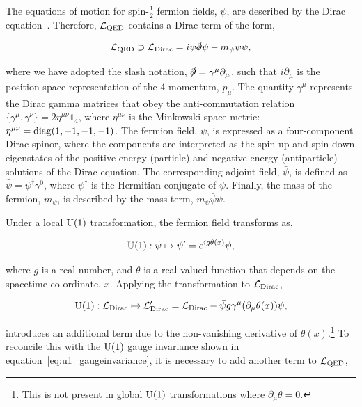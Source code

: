 The equations of motion for spin-$\frac{1}{2}$ fermion fields, $\psi$, are described by the Dirac equation~\cite{doi:10.1098_rspa.1928.0023}. Therefore, $\mathcal{L}_{\rm{QED}}$ contains a Dirac term of the form,

\begin{equation}
    \mathcal{L}_{\rm{QED}} \supset \mathcal{L}_{\rm{Dirac}} = i\bar{\psi}\slashed{\partial}\psi - m_{\psi}\bar{\psi}\psi,
\end{equation}

\noindent
where we have adopted the slash notation, $\slashed{\partial}=\gamma^\mu\partial_\mu$, such that $i\partial_\mu$ is the position space representation of the 4-momentum, $p_\mu$. The quantity $\gamma^\mu$ represents the Dirac gamma matrices that obey the anti-commutation relation $\{\gamma^\mu,\gamma^\nu\}=2\eta^{\mu\nu}\mathbb{1}_4$, where $\eta^{\mu\nu}$ is the Minkowski-space metric: $\eta^{\mu\nu}={\rm{diag}}(1,-1,-1,-1)$. The fermion field, $\psi$, is expressed as a four-component Dirac spinor, where the components are interpreted as the spin-up and spin-down eigenstates of the positive energy (particle) and negative energy (antiparticle) solutions of the Dirac equation. The corresponding adjoint field, $\bar{\psi}$, is defined as $\bar{\psi}=\psi^{\dagger}\gamma^0$, where $\psi^{\dagger}$ is the Hermitian conjugate of $\psi$. Finally, the mass of the fermion, $m_{\psi}$, is described by the mass term, $m_{\psi}\bar{\psi}\psi$.

Under a local ${\rm{U}}(1)$ transformation, the fermion field transforms as,

\begin{equation}
    {\rm{U}}(1): \psi \mapsto \psi' = e^{ig\theta(x)}\psi,
\end{equation}

\noindent
where $g$ is a real number, and $\theta$ is a real-valued function that depends on the spacetime co-ordinate, $x$. Applying the transformation to $\mathcal{L}_{\rm{Dirac}}$,

\begin{equation}\label{eq:u1_dirac}
    {\rm{U}}(1): \mathcal{L}_{\rm{Dirac}} \mapsto \mathcal{L}_{\rm{Dirac}}' = \mathcal{L}_{\rm{Dirac}} - \bar{\psi}g\gamma^\mu(\partial_\mu\theta(x))\psi,
\end{equation}

\noindent
introduces an additional term due to the non-vanishing derivative of $\theta(x)$.\footnote{This is not present in global ${\rm{U}}(1)$ transformations where $\partial_\mu\theta=0$.} To reconcile this with the ${\rm{U}}(1)$ gauge invariance shown in equation~\ref{eq:u1_gaugeinvariance}, it is necessary to add another term to $\mathcal{L}_{\rm{QED}}$,

